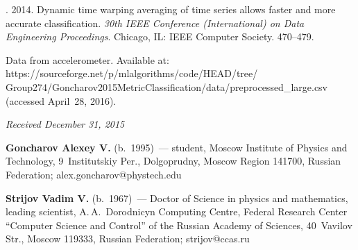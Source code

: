 \begin{multicols}{2}
{{\begin{thebibliography}{99}
. 
2014. Dynamic time warping averaging of time series allows faster and more accurate 
classification. \textit{30th IEEE Conference 
(International) on Data Engineering Proceedings}. Chicago, IL: IEEE Computer Society. 470--479.

Data from accelerometer. 
Available at:
{\sf https://\linebreak sourceforge.net/p/mlalgorithms/code/HEAD/tree/\linebreak 
Group274/Goncharov2015MetricClassification/data/\linebreak preprocessed\_large.csv}
(accessed April~28, 2016).
\end{thebibliography}

 }
 }

\end{multicols}

\vspace*{-3pt}

\hfill{\small\textit{Received December 31, 2015}}



\Contr

\noindent
\textbf{Goncharov Alexey V.} (b.\ 1995)~---
student, Moscow Institute of Physics and Technology, 
9~Institutskiy Per., Dolgoprudny, Moscow Region 141700, 
Russian Federation; alex.goncharov@phystech.edu

\vspace*{3pt}

\noindent
\textbf{Strijov Vadim V.} (b.\ 1967)~---
Doctor of Science in physics and mathematics, leading scientist, 
A.\,A.~Dorodnicyn Computing Centre, Federal Research Center 
``Computer Science and Control'' of the Russian Academy of Sciences, 
40~Vavilov Str., Moscow 119333, Russian Federation; strijov@ccas.ru


\label{end\stat}


\renewcommand{\bibname}{\protect\rm Литература}